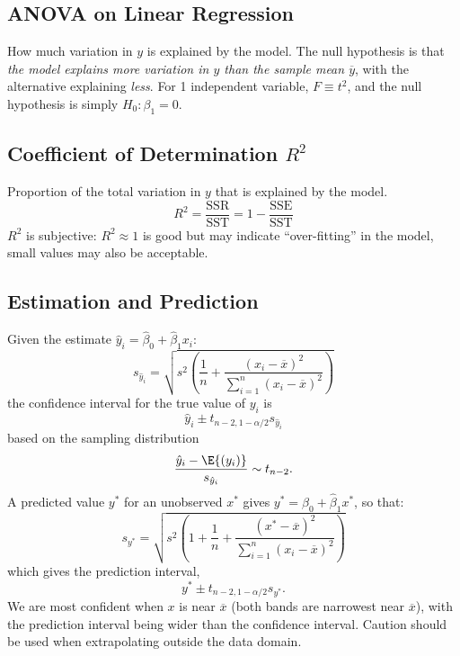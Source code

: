 \documentclass{article}
\begin{document}
\begin{multicols}{3}
    \subsection{ANOVA on Linear Regression}
    How much variation in \(y\) is explained by the model.
    The null hypothesis is that \textit{the model explains more variation in \(y\) than the sample mean \(\overline{y}\)},
    with the alternative explaining \textit{less}. For 1 independent variable, \(F \equiv t^2\), and the null hypothesis is simply
    \(H_0: \beta_1 = 0\).
    \subsection{Coefficient of Determination \texorpdfstring{\(R^2\)}{R2}}
    Proportion of the total variation in \(y\) that is explained by the model.
    \begin{equation*}
        R^2 = \frac{\mathrm{SSR}}{\mathrm{SST}} = 1 - \frac{\mathrm{SSE}}{\mathrm{SST}}
    \end{equation*}
    \(R^2\) is subjective: \(R^2 \approx 1\) is good but may indicate ``over-fitting''
    in the model, small values may also be acceptable.
    \subsection{Estimation and Prediction}
    Given the estimate \(\hat{y}_i = \hat{\beta}_0 + \hat{\beta}_1 x_i\):
    \begin{equation*}
        s_{\hat{y}_i} = \sqrt{s^2 \left( \frac{1}{n} + \frac{\left( x_i - \overline{x} \right)^2}{\sum_{i = 1}^n \left( x_i - \overline{x} \right)^2} \right)}
    \end{equation*}
    the confidence interval for the true value of \(y_i\) is
    \begin{equation*}
        \hat{y}_i \pm t_{n - 2, 1 - \alpha / 2} s_{\hat{y}_i}
    \end{equation*}
    based on the sampling distribution
    \begin{equation*}
        \frac{\hat{y}_i - \E{\left( y_i \right)}}{s_{\hat{y}_i}} \sim t_{n - 2}.
    \end{equation*}
    A predicted value \(y^\ast\) for an unobserved \(x^\ast\) gives \(y^\ast = \hat{\beta}_0 + \hat{\beta}_1 x^\ast\), so that:
    \begin{equation*}
        s_{y^\ast} = \sqrt{s^2 \left( 1 + \frac{1}{n} + \frac{\left( x^\ast - \overline{x} \right)^2}{\sum_{i = 1}^n \left( x_i - \overline{x} \right)^2} \right)}
    \end{equation*}
    which gives the prediction interval,
    \begin{equation*}
        y^\ast \pm t_{n - 2, 1 - \alpha / 2} s_{y^\ast}.
    \end{equation*}
    We are most confident when \(x\) is near \(\overline{x}\) (both bands are narrowest near \(\overline{x}\)),
    with the prediction interval being wider than the confidence interval. Caution should be used when extrapolating
    outside the data domain.

\end{multicols}
\end{document}
